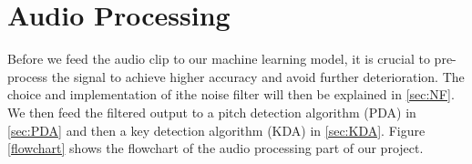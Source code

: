 
\chapter{Audio Processing} %
\label{Chapter5} %
Before we feed the audio clip to our machine learning model, it is crucial to pre-process the signal to achieve higher accuracy
and avoid further deterioration.
The choice and implementation of ithe noise filter will then be explained in \autoref{sec:NF}. We then feed the filtered output 
to a pitch detection algorithm (PDA) in \autoref{sec:PDA} and then a key detection algorithm (KDA) in \autoref{sec:KDA}.
Figure \ref{flowchart} shows the flowchart of the audio processing part of our project.

